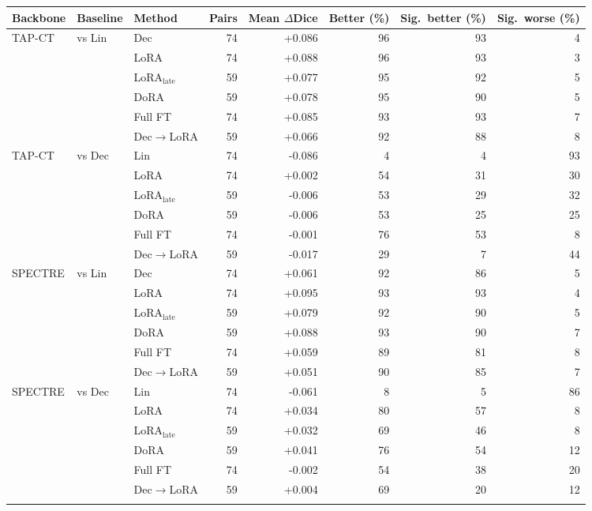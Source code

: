 \begin{tabular}{lllrrrrr}
\toprule
Backbone & Baseline & Method & Pairs & Mean $\Delta$Dice & Better (\%) & Sig.\ better (\%) & Sig.\ worse (\%) \\
\midrule
TAP-CT & vs Lin & Dec & 74 & +0.086 & 96 & 93 & 4 \\
 &  & LoRA & 74 & +0.088 & 96 & 93 & 3 \\
 &  & LoRA$_{\text{late}}$ & 59 & +0.077 & 95 & 92 & 5 \\
 &  & DoRA & 59 & +0.078 & 95 & 90 & 5 \\
 &  & Full FT & 74 & +0.085 & 93 & 93 & 7 \\
 &  & Dec$\to$LoRA & 59 & +0.066 & 92 & 88 & 8 \\
\addlinespace[2pt]
TAP-CT & vs Dec & Lin & 74 & -0.086 & 4 & 4 & 93 \\
 &  & LoRA & 74 & +0.002 & 54 & 31 & 30 \\
 &  & LoRA$_{\text{late}}$ & 59 & -0.006 & 53 & 29 & 32 \\
 &  & DoRA & 59 & -0.006 & 53 & 25 & 25 \\
 &  & Full FT & 74 & -0.001 & 76 & 53 & 8 \\
 &  & Dec$\to$LoRA & 59 & -0.017 & 29 & 7 & 44 \\
\addlinespace[2pt]
SPECTRE & vs Lin & Dec & 74 & +0.061 & 92 & 86 & 5 \\
 &  & LoRA & 74 & +0.095 & 93 & 93 & 4 \\
 &  & LoRA$_{\text{late}}$ & 59 & +0.079 & 92 & 90 & 5 \\
 &  & DoRA & 59 & +0.088 & 93 & 90 & 7 \\
 &  & Full FT & 74 & +0.059 & 89 & 81 & 8 \\
 &  & Dec$\to$LoRA & 59 & +0.051 & 90 & 85 & 7 \\
\addlinespace[2pt]
SPECTRE & vs Dec & Lin & 74 & -0.061 & 8 & 5 & 86 \\
 &  & LoRA & 74 & +0.034 & 80 & 57 & 8 \\
 &  & LoRA$_{\text{late}}$ & 59 & +0.032 & 69 & 46 & 8 \\
 &  & DoRA & 59 & +0.041 & 76 & 54 & 12 \\
 &  & Full FT & 74 & -0.002 & 54 & 38 & 20 \\
 &  & Dec$\to$LoRA & 59 & +0.004 & 69 & 20 & 12 \\
\addlinespace[2pt]
\bottomrule
\end{tabular}
